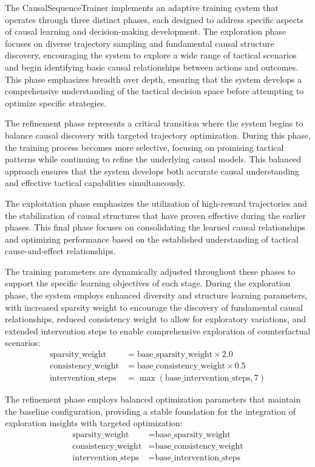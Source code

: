 \documentclass[12pt]{article}
\begin{document}
The CausalSequenceTrainer implements an adaptive training system that operates through three distinct phases, each designed to address specific aspects of causal learning and decision-making development. The exploration phase focuses on diverse trajectory sampling and fundamental causal structure discovery, encouraging the system to explore a wide range of tactical scenarios and begin identifying basic causal relationships between actions and outcomes. This phase emphasizes breadth over depth, ensuring that the system develops a comprehensive understanding of the tactical decision space before attempting to optimize specific strategies.

The refinement phase represents a critical transition where the system begins to balance causal discovery with targeted trajectory optimization. During this phase, the training process becomes more selective, focusing on promising tactical patterns while continuing to refine the underlying causal models. This balanced approach ensures that the system develops both accurate causal understanding and effective tactical capabilities simultaneously.

The exploitation phase emphasizes the utilization of high-reward trajectories and the stabilization of causal structures that have proven effective during the earlier phases. This final phase focuses on consolidating the learned causal relationships and optimizing performance based on the established understanding of tactical cause-and-effect relationships.

The training parameters are dynamically adjusted throughout these phases to support the specific learning objectives of each stage. During the exploration phase, the system employs enhanced diversity and structure learning parameters, with increased sparsity weight to encourage the discovery of fundamental causal relationships, reduced consistency weight to allow for exploratory variations, and extended intervention steps to enable comprehensive exploration of counterfactual scenarios:
\begin{align}
\text{sparsity\_weight} &= \text{base\_sparsity\_weight} \times 2.0 \\
\text{consistency\_weight} &= \text{base\_consistency\_weight} \times 0.5 \\
\text{intervention\_steps} &= \max(\text{base\_intervention\_steps}, 7)
\end{align}

The refinement phase employs balanced optimization parameters that maintain the baseline configuration, providing a stable foundation for the integration of exploration insights with targeted optimization:
\begin{align}
\text{sparsity\_weight} &= \text{base\_sparsity\_weight} \\
\text{consistency\_weight} &= \text{base\_consistency\_weight} \\
\text{intervention\_steps} &= \text{base\_intervention\_steps}
\end{align}
\end{document}
